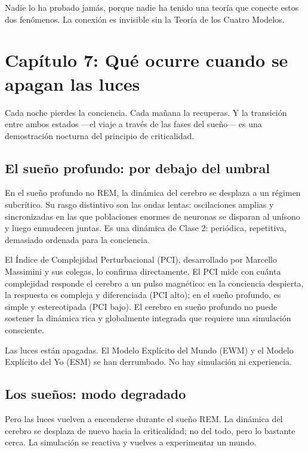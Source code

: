 \documentclass[11pt, twoside, openright]{book}
\begin{document}
Nadie lo ha probado jamás, porque nadie ha tenido una teoría que conecte estos dos fenómenos. La conexión es invisible sin la Teoría de los Cuatro Modelos.


\chapter*{Capítulo 7: Qué ocurre cuando se apagan las luces}

Cada noche pierdes la conciencia. Cada mañana la recuperas. Y la transición entre ambos estados ---el viaje a través de las fases del sueño--- es una demostración nocturna del principio de criticalidad.

\section*{El sueño profundo: por debajo del umbral}

En el sueño profundo no REM, la dinámica del cerebro se desplaza a un régimen subcrítico. Su rasgo distintivo son las ondas lentas: oscilaciones amplias y sincronizadas en las que poblaciones enormes de neuronas se disparan al unísono y luego enmudecen juntas. Es una dinámica de Clase 2: periódica, repetitiva, demasiado ordenada para la conciencia.

El Índice de Complejidad Perturbacional (PCI), desarrollado por Marcello Massimini y sus colegas, lo confirma directamente. El PCI mide con cuánta complejidad responde el cerebro a un pulso magnético: en la conciencia despierta, la respuesta es compleja y diferenciada (PCI alto); en el sueño profundo, es simple y estereotipada (PCI bajo). El cerebro en sueño profundo no puede sostener la dinámica rica y globalmente integrada que requiere una simulación consciente.

Las luces están apagadas. El Modelo Explícito del Mundo (EWM) y el Modelo Explícito del Yo (ESM) se han derrumbado. No hay simulación ni experiencia.

\section*{Los sueños: modo degradado}

Pero las luces vuelven a encenderse durante el sueño REM. La dinámica del cerebro se desplaza de nuevo hacia la criticalidad; no del todo, pero lo bastante cerca. La simulación se reactiva y vuelves a experimentar un mundo.
\end{document}

